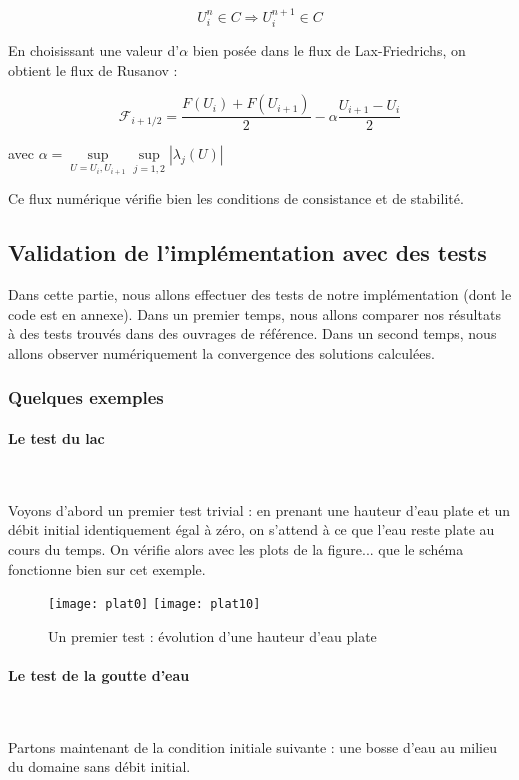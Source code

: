 \documentclass[
11pt, %
francais, %
singlespacing, %
headsepline, %
]{MastersDoctoralThesis} %
\theoremstyle{definition}
\begin{document}
$$ U_i ^n \in C \Rightarrow U_i ^{n+1} \in C  $$

En choisissant une valeur d'$\alpha$ bien posée dans le flux de Lax-Friedrichs, on obtient le flux de Rusanov :

$$ \mathcal{F}_{i+1/2} = \frac{F(U_i) + F(U_{i+1})}{2} - \alpha \frac{U_{i+1} - U_i}{2} $$

avec $ \alpha = \underset{U = U_i , U_{i+1}}{\sup} \underset{j = 1 , 2}{\sup} | \lambda_j(U) | $

Ce flux numérique vérifie bien les conditions de consistance et de stabilité.


\subsection{Validation de l'implémentation avec des tests}

Dans cette partie, nous allons effectuer des tests de notre implémentation (dont le code est en annexe).
Dans un premier temps, nous allons comparer nos résultats à des tests trouvés dans des ouvrages de référence.
Dans un second temps, nous allons observer numériquement la convergence des solutions calculées.

\subsubsection{Quelques exemples}

\paragraph{Le test du lac} \

Voyons d'abord un premier test trivial : en prenant une hauteur d'eau plate et un débit initial identiquement égal à zéro, on s'attend à ce que l'eau reste plate au cours du temps.
On vérifie 	alors avec les plots de la figure... que le schéma fonctionne bien sur cet exemple.

\begin{figure}
\texttt{[image: plat0]}
\texttt{[image: plat10]} 
\caption{Un premier test : évolution d'une hauteur d'eau plate}
\end{figure}

\paragraph{Le test de la goutte d'eau} \

Partons maintenant de la condition initiale suivante : une bosse d'eau au milieu du domaine sans débit initial.
\end{document}
